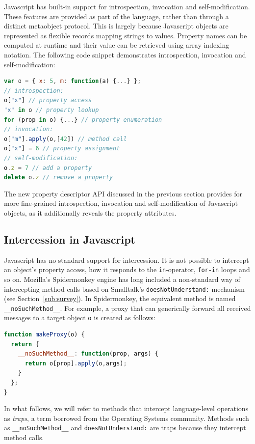 \documentclass{sig-alternate}
\newcommand{\noSuchMethod}{\texttt{\_\_noSuchMethod\_\_}}
\begin{document}
Javascript has built-in support for introspection, invocation and self-modification. These features are provided as part of the language, rather than through a distinct metaobject protocol. This is largely because Javascript objects are represented as flexible records mapping strings to values. Property names can be computed at runtime and their value can be retrieved using array indexing notation. The following code snippet demonstrates introspection, invocation and self-modification:

\begin{lstlisting}[language=javascript]
var o = { x: 5, m: function(a) {...} };
// introspection:
o["x"] // property access
"x" in o // property lookup
for (prop in o) {...} // property enumeration
// invocation:
o["m"].apply(o,[42]) // method call
o["x"] = 6 // property assignment
// self-modification:
o.z = 7 // add a property
delete o.z // remove a property
\end{lstlisting}

The new property descriptor API discussed in the previous section provides for more fine-grained introspection, invocation and self-modification of Javascript objects, as it additionally reveals the property attributes.

\subsection{Intercession in Javascript}
\label{sub:intercession_in_javascript}

Javascript has no standard support for intercession. It is not possible to intercept an object's property access, how it responds to the \texttt{in}-operator, \texttt{for-in} loops and so on. Mozilla's Spidermonkey engine has long included a non-standard way of intercepting method calls based on Smalltalk's \texttt{doesNotUnderstand:} mechanism (see Section~\ref{sub:survey}). In Spidermonkey, the equivalent method is named \noSuchMethod{}. For example, a proxy that can generically forward all received messages to a target object \texttt{o} is created as follows:

\begin{lstlisting}[language=javascript]
function makeProxy(o) {
  return {
    __noSuchMethod__: function(prop, args) {
      return o[prop].apply(o,args);
    }
  };
}
\end{lstlisting}

In what follows, we will refer to methods that intercept language-level operations as \emph{traps}, a term borrowed from the Operating Systems community. Methods such as \noSuchMethod{} and \texttt{doesNotUnderstand:} are traps because they intercept method calls.
\end{document}
